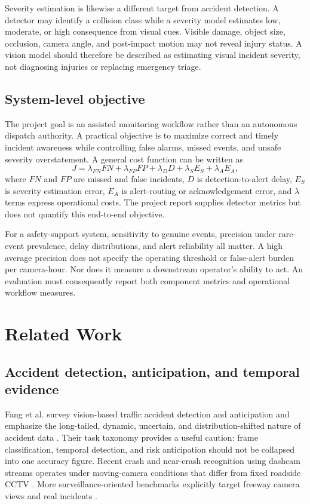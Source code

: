 \documentclass[12pt,a4paper]{article}
\begin{document}
Severity estimation is likewise a different target from accident detection. A detector may identify a collision class while a severity model estimates low, moderate, or high consequence from visual cues. Visible damage, object size, occlusion, camera angle, and post-impact motion may not reveal injury status. A vision model should therefore be described as estimating visual incident severity, not diagnosing injuries or replacing emergency triage.

\subsection{System-level objective}
The project goal is an assisted monitoring workflow rather than an autonomous dispatch authority. A practical objective is to maximize correct and timely incident awareness while controlling false alarms, missed events, and unsafe severity overstatement. A general cost function can be written as
\begin{equation}
J = \lambda_{FN} FN + \lambda_{FP} FP + \lambda_{D}D + \lambda_{S}E_S + \lambda_{A}E_A,
\end{equation}
where $FN$ and $FP$ are missed and false incidents, $D$ is detection-to-alert delay, $E_S$ is severity estimation error, $E_A$ is alert-routing or acknowledgement error, and $\lambda$ terms express operational costs. The project report supplies detector metrics but does not quantify this end-to-end objective.

For a safety-support system, sensitivity to genuine events, precision under rare-event prevalence, delay distributions, and alert reliability all matter. A high average precision does not specify the operating threshold or false-alert burden per camera-hour. Nor does it measure a downstream operator's ability to act. An evaluation must consequently report both component metrics and operational workflow measures.

\section{Related Work}
\subsection{Accident detection, anticipation, and temporal evidence}
Fang et al. survey vision-based traffic accident detection and anticipation and emphasize the long-tailed, dynamic, uncertain, and distribution-shifted nature of accident data \cite{fang2024}. Their task taxonomy provides a useful caution: frame classification, temporal detection, and risk anticipation should not be collapsed into one accuracy figure. Recent crash and near-crash recognition using dashcam streams operates under moving-camera conditions that differ from fixed roadside CCTV \cite{shi2024two}. More surveillance-oriented benchmarks explicitly target freeway camera views and real incidents \cite{xu2022tad,zimmer2025}.
\end{document}
